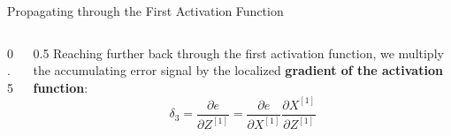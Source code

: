 \begin{frame}{Propagating through the First Activation Function}
\begin{columns}
\begin{column}{0.5\textwidth}
\begin{center}
{\begin{tikzpicture}
					\end{tikzpicture}
				}
			\end{center}
		\end{column}
		\begin{column}{0.5\textwidth}
			Reaching further back through the first activation function, we multiply the accumulating error signal by the localized \textbf{\textcolor{lime!80!black}{gradient of the activation function}}:
			\begin{equation*}
				\delta_3 = \frac{\partial{e}}{\partial{Z^{[1]}}} = \frac{\partial{e}}{\partial{X^{[1]}}} \frac{\partial{X^{[1]}}}{\partial{Z^{[1]}}}
			\end{equation*}
		\end{column}
	\end{columns}
\end{frame}

